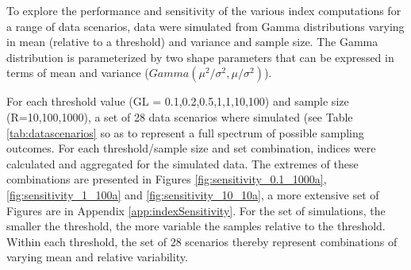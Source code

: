To explore the performance and sensitivity of the various index computations for a range of data
scenarios, data were simulated from Gamma distributions varying in mean (relative to a threshold)
and variance and sample size.  The Gamma distribution is parameterized by two shape parameters that
can be expressed in terms of mean and variance ($Gamma(\mu^2/\sigma^2, \mu/\sigma^2)$).

For each threshold value (GL = {0.1,0.2,0.5,1,1,10,100}) and sample size (R={10,100,1000}), a set of
28 data scenarios where simulated (see Table \ref{tab:datascenarios} so as to represent a full
spectrum of possible sampling outcomes.  For each threshold/sample size and set combination, indices
were calculated and aggregated for the simulated data.  The extremes of these combinations are
presented in Figures \ref{fig:sensitivity_0.1_1000a}, \ref{fig:sensitivity_1_100a} and
\ref{fig:sensitivity_10_10a}, a more extensive set of Figures are in Appendix
\ref{app:indexSensitivity}.  For the set of simulations, the smaller the threshold, the more
variable the samples relative to the threshold.  Within each threshold, the set of 28 scenarios
thereby represent combinations of varying mean and relative variability.


